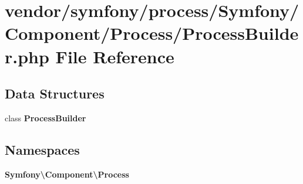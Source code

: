 \section{vendor/symfony/process/\+Symfony/\+Component/\+Process/\+Process\+Builder.php File Reference}
\label{_process_builder_8php}
\subsection*{Data Structures}
\begin{DoxyCompactItemize}
\item 
class {\bf Process\+Builder}
\end{DoxyCompactItemize}
\subsection*{Namespaces}
\begin{DoxyCompactItemize}
\item 
 {\bf Symfony\textbackslash{}\+Component\textbackslash{}\+Process}
\end{DoxyCompactItemize}
